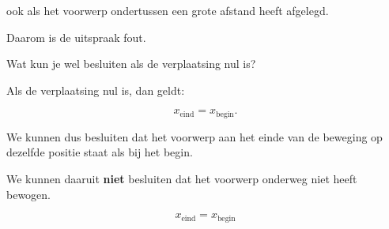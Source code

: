 \documentclass{ximera}
\begin{document}
\begin{oefening}{\oefU\ESS}
\begin{question}
\begin{oplossing}
  ook als het voorwerp ondertussen een grote afstand heeft afgelegd.
  
  Daarom is de uitspraak fout.
  \end{oplossing}
  \end{question}
  
  
  \begin{question}
  Wat kun je wel besluiten als de verplaatsing nul is?
  
  \begin{oplossing}
  Als de verplaatsing nul is, dan geldt:
  
  \[
  x_{\text{eind}}
  =
  x_{\text{begin}}.
  \]
  
  We kunnen dus besluiten dat het voorwerp aan het einde van de beweging op
  dezelfde positie staat als bij het begin.
  
  We kunnen daaruit \textbf{niet} besluiten dat het voorwerp onderweg niet heeft
  bewogen.
  
  \[
  \boxed{x_{\text{eind}}=x_{\text{begin}}}
  \]
  \end{oplossing}
  \end{question}
  
  \end{oefening}
  
  
  
\end{document}
